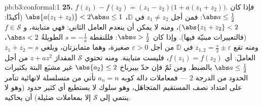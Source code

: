 \begin{solution}{pb:b3:conformal:1}
\textbf{25.} $f(z_1) - f(z_2) = (z_1 - z_2)\bigl(1 + a(z_1 +
z_2)\bigr)$. فإذا كان $\abs a \leq \frac12$: فمن أجل
$z_1 \neq z_2$ في $\mathbb D$، $\abs{a(z_1 + z_2)} < 2\abs a \leq 1$ (أكيدًا: $\abs{z_1 + z_2} < 2$)، ومنه
لا يمكن أن ينعدم العامل الثاني: فهي متباينة، و $f \in \mathcal S$
(فالتعييرات مبنيّة فيها). وإذا كان $\abs a > \frac12$: فللنقطة $s =
-\frac1a$
الطويلةُ $\abs s < 2$، ومنه تقع $z_{1,2} = \frac s2 \pm
\varepsilon$ في $\mathbb D$ من أجل
$\varepsilon > 0$ صغيرة، وهما متمايزتان، ويلغي $z_1 + z_2 = s$ العاملَ:
أي $f(z_1)
= f(z_2)$، فليست متباينة. ومنه تحتوي $\mathcal S$ المقدارَ
$z +
az^2$ من أجل $\abs a \leq \frac12$ بالضبط. ومن ثَمّ فإن حدّ بيبرباخ $\abs{a_2} \leq 2$
غير مشبَع البتة بكثيرات الحدود من الدرجة $2$ --- فمعاملات دالة
كوبه $a_n = n$ تأتي من متسلسلة لانهائية تتآمر على امتداد نصف
المستقيم المتجاهَل، وهو سلوك لا يستطيع أي كثير حدود (وهو لا
ينتمي إلى $\mathcal S$ إلا بمعاملات ضئيلة) أن يحاكيه.
\end{solution}

